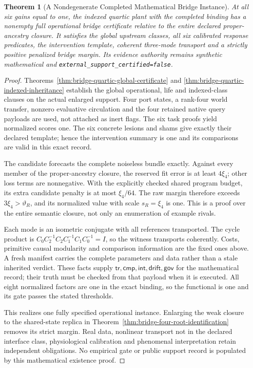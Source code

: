 \documentclass[11pt,a4paper]{article}
\newtheorem{theorem}{Theorem}[section]
\theoremstyle{definition}
\begin{document}
\begin{theorem}[A Nondegenerate Completed Mathematical Bridge Instance]
\label{thm:bridge-realization-exists}
At all six gains equal to one, the indexed quartic plant with the completed
binding has a nonempty full operational bridge certificate relative to the
entire declared proper-ancestry closure. It satisfies the global upstream
classes, all six calibrated response predicates, the intervention template,
coherent three-mode transport and a strictly positive penalized bridge margin.
Its evidence authority remains synthetic mathematical and
\texttt{external\_support\_certified=false}.
\end{theorem}
\begin{proof}
Theorems~\ref{thm:bridge-quartic-global-certificate} and
\ref{thm:bridge-quartic-indexed-inheritance} establish the global operational,
life and indexed-class clauses on the actual enlarged support. Four port
states, a rank-four world transfer, nonzero evaluative circulation and the
four retained native query payloads are used, not attached as inert flags.
The six task proofs yield normalized scores one. The six concrete lesions
and shams give exactly their declared template; hence the intervention
summary is one and its comparisons are valid in this exact record.

The candidate forecasts the complete noiseless bundle exactly. Against
every member of the proper-ancestry closure, the reserved fit error is at
least $4\xi_4$; other loss terms are nonnegative. With the explicitly checked
shared program budget, its extra candidate penalty is at most $\xi_4/64$.
The raw margin therefore exceeds $3\xi_4>\vartheta_R$, and its normalized
value with scale $s_R=\xi_4$ is one. This is a proof over the entire
semantic closure, not only an enumeration of example rivals.

Each mode is an isometric conjugate with all references transported. The
cycle product is $C_0C_2^{-1}C_2C_1^{-1}C_1C_0^{-1}=I$, so the witness
transports coherently. Costs, primitive causal modularity and comparison
information are the fixed ones above. A fresh manifest carries the complete
parameters and data rather than a stale inherited verdict. These facts
supply $\mathsf{tr},\mathsf{cmp},\mathsf{int},\mathsf{drift},\mathsf{gov}$
for the mathematical record; their truth must be checked from that payload
when it is executed. All eight normalized factors are one in the exact
binding, so the functional is one and its gate passes the stated thresholds.

This realizes one fully specified operational instance. Enlarging the weak
closure to the shared-state replica in
Theorem~\ref{thm:bridge-four-root-identification} removes its strict margin.
Real data, nonlinear transport not in the declared interface class,
physiological calibration and phenomenal interpretation retain independent
obligations. No empirical gate or public support record is populated by this
mathematical existence proof.
\end{proof}
\end{document}
